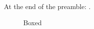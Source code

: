 \documentclass[a4paper,onecolumn,unpublished]{quantumarticle}
\begin{document}
At the end of the preamble: \captionready.
\begin{figure}\caption{Boxed}\end{figure}
\end{document}
